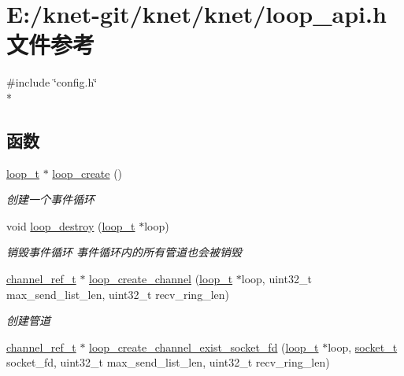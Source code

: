 \hypertarget{a00054}{}\section{E\+:/knet-\/git/knet/knet/loop\+\_\+api.h 文件参考}
\label{a00054}
{\ttfamily \#include \char`\"{}config.\+h\char`\"{}}\\*
\subsection*{函数}
\begin{DoxyCompactItemize}
\item 
\hyperlink{a00044_a9c3ad1cd2de83e09f3a7b59fa82c94ee_a9c3ad1cd2de83e09f3a7b59fa82c94ee}{loop\+\_\+t} $\ast$ \hyperlink{a00085_ga878bf0cd280e0bd183144bb95ca4a7b1_ga878bf0cd280e0bd183144bb95ca4a7b1}{loop\+\_\+create} ()
\begin{DoxyCompactList}\small\item\em 创建一个事件循环 \end{DoxyCompactList}\item 
void \hyperlink{a00085_ga921fd5e5e16a73de123e81baab187a0a_ga921fd5e5e16a73de123e81baab187a0a}{loop\+\_\+destroy} (\hyperlink{a00044_a9c3ad1cd2de83e09f3a7b59fa82c94ee_a9c3ad1cd2de83e09f3a7b59fa82c94ee}{loop\+\_\+t} $\ast$loop)
\begin{DoxyCompactList}\small\item\em 销毁事件循环 事件循环内的所有管道也会被销毁 \end{DoxyCompactList}\item 
\hyperlink{a00044_a151271c9d188ef28d4d24bb81dcc1263_a151271c9d188ef28d4d24bb81dcc1263}{channel\+\_\+ref\+\_\+t} $\ast$ \hyperlink{a00085_gab5b73ea9a0347b431f93ebf30ecd05b5_gab5b73ea9a0347b431f93ebf30ecd05b5}{loop\+\_\+create\+\_\+channel} (\hyperlink{a00044_a9c3ad1cd2de83e09f3a7b59fa82c94ee_a9c3ad1cd2de83e09f3a7b59fa82c94ee}{loop\+\_\+t} $\ast$loop, uint32\+\_\+t max\+\_\+send\+\_\+list\+\_\+len, uint32\+\_\+t recv\+\_\+ring\+\_\+len)
\begin{DoxyCompactList}\small\item\em 创建管道 \end{DoxyCompactList}\item 
\hyperlink{a00044_a151271c9d188ef28d4d24bb81dcc1263_a151271c9d188ef28d4d24bb81dcc1263}{channel\+\_\+ref\+\_\+t} $\ast$ \hyperlink{a00085_ga6879ac453ef83768ce8f8ef43a474409_ga6879ac453ef83768ce8f8ef43a474409}{loop\+\_\+create\+\_\+channel\+\_\+exist\+\_\+socket\+\_\+fd} (\hyperlink{a00044_a9c3ad1cd2de83e09f3a7b59fa82c94ee_a9c3ad1cd2de83e09f3a7b59fa82c94ee}{loop\+\_\+t} $\ast$loop, \hyperlink{a00044_a0d9e0afbf02fb6ed6c5b1415dce51b05_a0d9e0afbf02fb6ed6c5b1415dce51b05}{socket\+\_\+t} socket\+\_\+fd, uint32\+\_\+t max\+\_\+send\+\_\+list\+\_\+len, uint32\+\_\+t recv\+\_\+ring\+\_\+len)

\end{DoxyCompactItemize}
